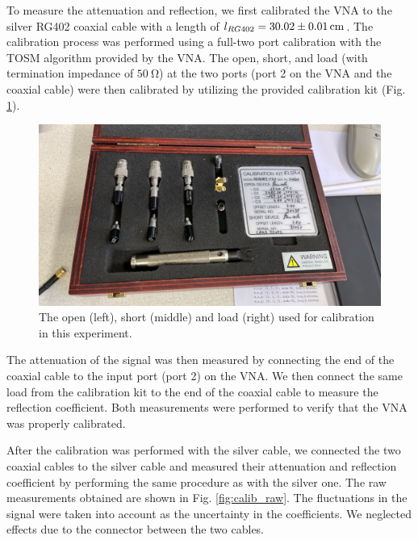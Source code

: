 \documentclass[a4paper]{report}
\numberwithin{equation}{section}
\begin{document}
To measure the attenuation and reflection, we first calibrated the VNA to the
silver RG402 coaxial cable with a length of $l_{RG402} = \SI{30.02 \pm
0.01}{\centi\meter}$. The calibration process was performed using a full-two
port calibration with the TOSM algorithm provided by the VNA. The open, short,
and load (with termination impedance of $\SI{50}{\ohm}$) at the two ports (port
2 on the VNA and the coaxial cable) were then calibrated by utilizing the
provided calibration kit (Fig. \ref{fig:calibration_kit}). 

\begin{figure}[hbt!]
	\centering
	\includegraphics[width=0.6\columnwidth]{calibration_kit.jpg}
	\caption{The open (left), short (middle) and load (right) used for
			calibration in this experiment.}

	\label{fig:calibration_kit}
\end{figure}

The attenuation of the signal was then measured by connecting the end of the
coaxial cable to the input port (port 2) on the VNA. We then connect the same
load from the calibration kit to the end of the coaxial cable to measure the
reflection coefficient. Both measurements were performed to verify that the VNA
was properly calibrated. \par 

After the calibration was performed with the silver cable, we connected the two
coaxial cables to the silver cable and measured their attenuation and reflection
coefficient by performing the same procedure as with the silver one. The raw
measurements obtained are shown in Fig.  \ref{fig:calib_raw}. The fluctuations in the signal were taken into account as the
uncertainty in the coefficients. We neglected effects due to the connector
between the two cables.
\end{document}
